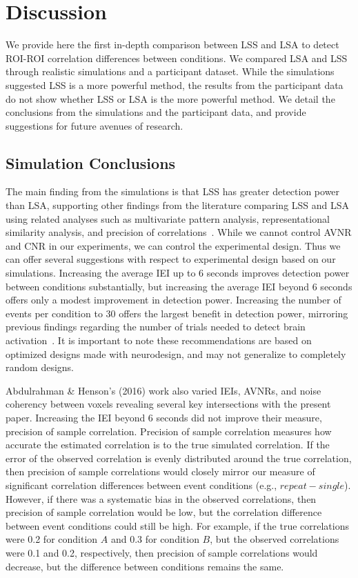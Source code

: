 \documentclass[phd,appendix,figures]{uithesis}
\begin{document}
\section*{Discussion}
\label{discussion}

We provide here the first in-depth comparison between LSS and LSA to detect 
ROI-ROI correlation differences between conditions.
We compared LSA and LSS through realistic simulations and a participant dataset.
While the simulations suggested LSS is a more powerful method,
the results from the participant data do not show whether LSS or LSA is the more powerful method.
We detail the conclusions from the simulations and the participant data, and provide
suggestions for future avenues of research.

\subsection*{Simulation Conclusions}
\label{discussion:simulation-conclusions}

The main finding from the simulations is that LSS has greater detection power than LSA,
supporting other findings from the literature comparing LSS and LSA using related analyses such as
multivariate pattern analysis, representational similarity analysis, and precision of correlations~\cite{Mumford2012,Mumford2014a,Abdulrahman2016,Turner2012a}.
While we cannot control AVNR and CNR in our experiments, we can control the experimental design.
Thus we can offer several suggestions with respect to experimental design based on our simulations.
Increasing the average IEI up to 6 seconds improves detection power between conditions substantially,
but increasing the average IEI beyond 6 seconds offers only a modest improvement in detection power.
Increasing the number of events per condition to 30 offers the largest benefit in detection power,
mirroring previous findings regarding the number of trials needed to detect brain activation~\cite{Huettel2001}.
It is important to note these recommendations are based on optimized designs made with neurodesign,
and may not generalize to completely random designs.

Abdulrahman \& Henson's (2016) work also varied IEIs, AVNRs, and noise coherency between voxels
revealing several key intersections with the present paper.
Increasing the IEI beyond 6 seconds did not improve their measure, precision of sample correlation.
Precision of sample correlation measures how accurate the estimated correlation is to the true
simulated correlation.
If the error of the observed correlation is evenly distributed around the
true correlation, then precision of sample correlations would closely mirror our measure of
significant correlation differences between event conditions (e.g., $repeat - single$).
However, if there was a systematic bias in the observed correlations, then precision of sample correlation
would be low, but the correlation difference between event conditions could still be high.
For example, if the true correlations were 0.2 for condition $A$ and 0.3 for condition $B$, but
the observed correlations were 0.1 and 0.2, respectively, then precision of sample correlations would
decrease, but the difference between conditions remains the same.
\end{document}
